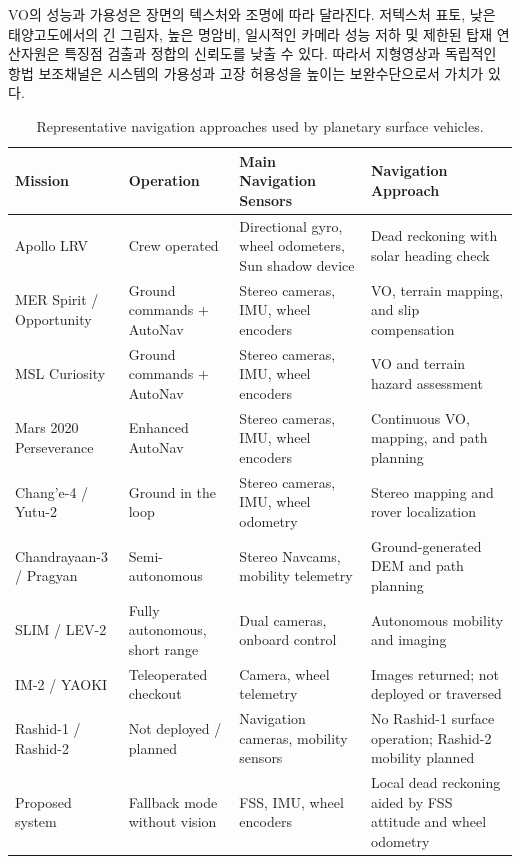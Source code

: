 \documentclass[]{IAC_style}
\begin{document}
VO의 성능과 가용성은 장면의 텍스처와 조명에 따라 달라진다. 저텍스처 표토, 낮은 태양고도에서의 긴 그림자, 높은 명암비, 일시적인 카메라 성능 저하 및 제한된 탑재 연산자원은 특징점 검출과 정합의 신뢰도를 낮출 수 있다. 따라서 지형영상과 독립적인 항법 보조채널은 시스템의 가용성과 고장 허용성을 높이는 보완수단으로서 가치가 있다.

\FloatBarrier
\begin{table}[!t]
\centering
\caption{Representative navigation approaches used by planetary surface vehicles.}
\label{tab:rover_navigation}
\scriptsize
\begin{tabularx}{\textwidth}{p{}p{}p{}X}
\toprule
\textbf{Mission} & \textbf{Operation} & \textbf{Main Navigation Sensors} & \textbf{Navigation Approach} \\
\midrule
Apollo LRV~\cite{smith1973lrv} & Crew operated & Directional gyro, wheel odometers, Sun shadow device & Dead reckoning with solar heading check \\
MER Spirit / Opportunity~\cite{maimone2007mer} & Ground commands + AutoNav & Stereo cameras, IMU, wheel encoders & VO, terrain mapping, and slip compensation \\
MSL Curiosity~\cite{rankin2021curiosity} & Ground commands + AutoNav & Stereo cameras, IMU, wheel encoders & VO and terrain hazard assessment \\
Mars 2020 Perseverance~\cite{verma2023perseverance} & Enhanced AutoNav & Stereo cameras, IMU, wheel encoders & Continuous VO, mapping, and path planning \\
Chang'e-4 / Yutu-2~\cite{ma2020yutu2} & Ground in the loop & Stereo cameras, IMU, wheel odometry & Stereo mapping and rover localization \\
Chandrayaan-3 / Pragyan~\cite{isro2024pragyan} & Semi-autonomous & Stereo Navcams, mobility telemetry & Ground-generated DEM and path planning \\
SLIM / LEV-2~\cite{jaxa2024lev2} & Fully autonomous, short range & Dual cameras, onboard control & Autonomous mobility and imaging \\
IM-2 / YAOKI~\cite{dymon2025yaoki} & Teleoperated checkout & Camera, wheel telemetry & Images returned; not deployed or traversed \\
Rashid-1 / Rashid-2~\cite{ispace2023m1,mbrsc2026rashid} & Not deployed / planned & Navigation cameras, mobility sensors & No Rashid-1 surface operation; Rashid-2 mobility planned \\
Proposed system & Fallback mode without vision & FSS, IMU, wheel encoders & Local dead reckoning aided by FSS attitude and wheel odometry \\
\bottomrule
\end{tabularx}
\end{table}
\end{document}
